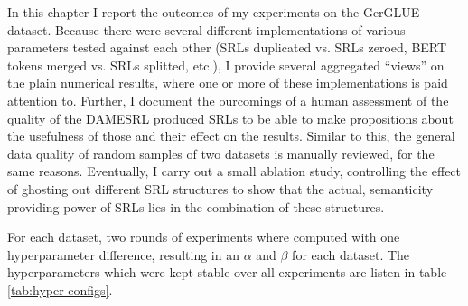 \label{chap:5_results}


In this chapter I report the outcomes of my experiments on the GerGLUE dataset. Because there
were several different implementations of various parameters tested against each other (SRLs duplicated vs.
SRLs zeroed, BERT tokens merged vs. SRLs splitted, etc.), I provide several aggregated ``views'' on the
plain numerical results, where one or more of these implementations is paid attention to. Further, I
document the ourcomings of a human assessment of the quality of the DAMESRL produced SRLs to be able to
make propositions about the usefulness of those and their effect on the results. Similar to this, the
general data quality of random samples of two datasets is manually reviewed, for the same reasons.
Eventually, I carry out a small ablation study, controlling the effect of ghosting out different
SRL structures to show that the actual, semanticity providing power of SRLs lies in the combination
of these structures.

For each dataset, two
rounds of experiments where computed with one hyperparameter difference, resulting in
an $\alpha$ and $\beta$ for each dataset. The hyperparameters which were kept stable
over all experiments are listen in table \ref{tab:hyper-configs}.


